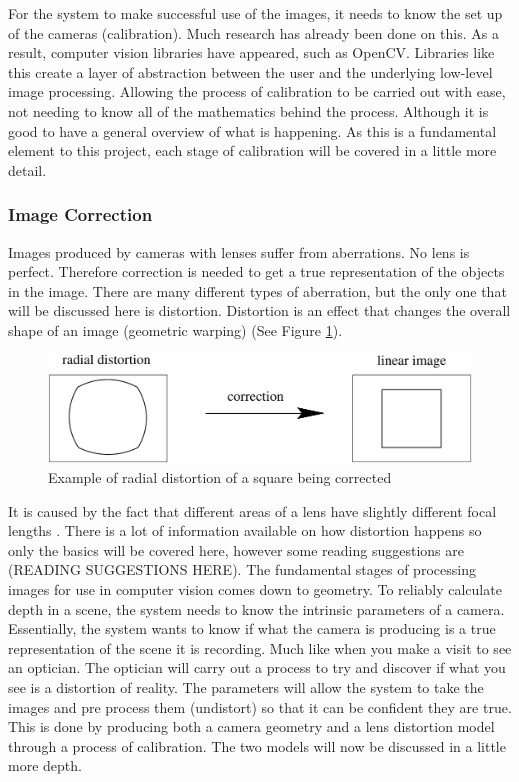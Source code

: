 \documentclass[11pt,oneside]{report}
\begin{document}
			For the system to make successful use of the images, it needs to know the set up of the cameras (calibration).
			Much research has already been done on this.
			As a result, computer vision libraries have appeared, such as OpenCV.
			Libraries like this create a layer of abstraction between the user and the underlying low-level image processing.
			Allowing the process of calibration to be carried out with ease, not needing to know all of the mathematics behind the process.
			Although it is good to have a general overview of what is happening.
			As this is a fundamental element to this project, each stage of calibration will be covered in a little more detail.
				\subsubsection{Image Correction}
				Images produced by cameras with lenses suffer from aberrations.
				No lens is perfect.
				Therefore correction is needed to get a true representation of the objects in the image.
				There are many different types of aberration, but the only one that will be discussed here is distortion.
				Distortion is an effect that changes the overall shape of an image (geometric warping) (See Figure \ref{fig:distortion}).
				\begin{figure}[!h]
				\begin{center}
					
    					\includegraphics[scale=0.5]{distortion_1}
    					\caption{Example of radial distortion of a square being corrected \protect\cite{book:multiViewGeo} {\label{fig:distortion}}}
    				\end{center}
				\end{figure}				
				It is caused by the fact that different areas of a lens have slightly different focal lengths \cite[p. 42]{book:modern}.
				There is a lot of information available on how distortion happens so only the basics will be covered here, however some reading suggestions are (READING SUGGESTIONS HERE).
				The fundamental stages of processing images for use in computer vision comes down to geometry.
				To reliably calculate depth in a scene, the system needs to know the intrinsic %
				parameters of a camera.
				Essentially, the system wants to know if what the camera is producing is a true representation of the scene it is recording.
				Much like when you make a visit to see an optician. 
				The optician will carry out a process to try and discover if what you see is a distortion of reality.
				The parameters will allow the system to take the images and pre process them (undistort) so that it can be confident they are true.
				This is done by producing both a camera geometry and a lens distortion model through a process of calibration.  
				The two models will now be discussed in a little more depth.				
\end{document}
